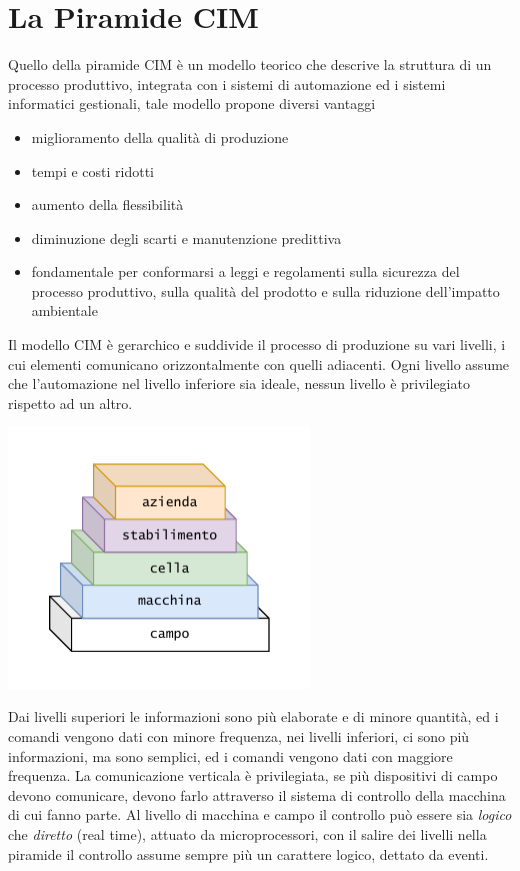 \documentclass[10pt, letterpaper]{report}
\begin{document}
\section{La Piramide CIM}
Quello della piramide CIM è un modello teorico che descrive la struttura di un processo produttivo, integrata 
con i sistemi di automazione ed i sistemi informatici gestionali, tale modello propone diversi vantaggi\begin{itemize}
    \item miglioramento della qualità di produzione 
    \item tempi e costi ridotti 
    \item aumento della flessibilità 
    \item diminuzione degli scarti e manutenzione predittiva 
    \item fondamentale per conformarsi a leggi e regolamenti sulla 
    sicurezza del processo produttivo, sulla qualità del prodotto e sulla riduzione dell'impatto ambientale
\end{itemize}
Il modello CIM è gerarchico e suddivide il processo di produzione su vari livelli, i cui elementi comunicano 
orizzontalmente con quelli adiacenti. Ogni livello assume che l'automazione nel livello inferiore sia 
ideale, nessun livello è privilegiato rispetto ad un altro.\begin{center}
    \includegraphics[width=0.6\textwidth ]{images/cim.pdf}
\end{center}
Dai livelli superiori le informazioni sono più elaborate e di minore quantità, ed i comandi vengono dati con minore 
frequenza, nei livelli inferiori, ci sono 
più informazioni, ma sono semplici, ed i comandi vengono dati con maggiore 
frequenza. La comunicazione verticala è privilegiata, se più dispositivi di campo devono 
comunicare, devono farlo attraverso il sistema di controllo della macchina di cui fanno parte. \acc 
Al livello di macchina e campo il controllo può essere sia \textit{logico} che \textit{diretto} (real time), 
attuato da microprocessori, con il salire dei livelli nella piramide il controllo assume sempre più un carattere 
logico, dettato da eventi.
\end{document}
